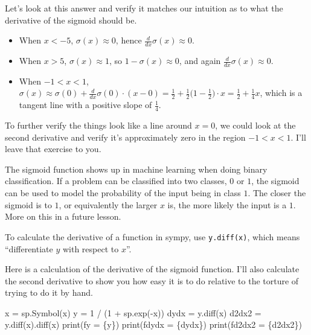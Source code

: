 \documentclass[
  letterpaper,
  DIV=11,
  numbers=noendperiod]{scrreprt}
\newenvironment{Shaded}{\begin{snugshade}}{\end{snugshade}}
\newcommand{\BuiltInTok}[1]{\textcolor[rgb]{0.00,0.23,0.31}{#1}}
\newcommand{\DecValTok}[1]{\textcolor[rgb]{0.68,0.00,0.00}{#1}}
\newcommand{\NormalTok}[1]{\textcolor[rgb]{0.00,0.23,0.31}{#1}}
\newcommand{\OperatorTok}[1]{\textcolor[rgb]{0.37,0.37,0.37}{#1}}
\newcommand{\SpecialCharTok}[1]{\textcolor[rgb]{0.37,0.37,0.37}{#1}}
\newcommand{\SpecialStringTok}[1]{\textcolor[rgb]{0.13,0.47,0.30}{#1}}
\newcommand{\StringTok}[1]{\textcolor[rgb]{0.13,0.47,0.30}{#1}}
\providecommand{\tightlist}{%
  \setlength{\itemsep}{0pt}\setlength{\parskip}{0pt}}\usepackage{longtable,booktabs,array}
\begin{document}
Let's look at this answer and verify it matches our intuition as to what
the derivative of the sigmoid should be.

\begin{itemize}
\tightlist
\item
  When \(x < -5\), \(\sigma(x) \approx 0\), hence
  \(\frac{d}{dx} \sigma(x) \approx 0\).
\item
  When \(x > 5\), \(\sigma(x) \approx 1\), so
  \(1 - \sigma(x) \approx 0\), and again
  \(\frac{d}{dx} \sigma(x) \approx 0\).
\item
  When \(-1 < x < 1\),
  \(\sigma(x) \approx \sigma(0) + \frac{d}{dx}\sigma(0) \cdot (x-0) = \frac{1}{2} + \frac{1}{2}\big(1 - \frac{1}{2}\big) \cdot x = \frac{1}{2} + \frac{1}{4}x\),
  which is a tangent line with a positive slope of \(\frac{1}{4}\).
\end{itemize}

To further verify the things look like a line around \(x=0\), we could
look at the second derivative and verify it's approximately zero in the
region \(-1 < x < 1\). I'll leave that exercise to you.

The sigmoid function shows up in machine learning when doing binary
classification. If a problem can be classified into two classes, \(0\)
or \(1\), the sigmoid can be used to model the probability of the input
being in class \(1\). The closer the sigmoid is to \(1\), or
equivalently the larger \(x\) is, the more likely the input is a \(1\).
More on this in a future lesson.

To calculate the derivative of a function in sympy, use
\texttt{y.diff(x)}, which means ``differentiate \(y\) with respect to
\(x\)''.

Here is a calculation of the derivative of the sigmoid function. I'll
also calculate the second derivative to show you how easy it is to do
relative to the torture of trying to do it by hand.

\begin{Shaded}
\begin{Highlighting}[]
\NormalTok{x }\OperatorTok{=}\NormalTok{ sp.Symbol(}\StringTok{\textquotesingle{}x\textquotesingle{}}\NormalTok{)}
\NormalTok{y }\OperatorTok{=} \DecValTok{1} \OperatorTok{/}\NormalTok{ (}\DecValTok{1} \OperatorTok{+}\NormalTok{ sp.exp(}\OperatorTok{{-}}\NormalTok{x))}
\NormalTok{dydx }\OperatorTok{=}\NormalTok{ y.diff(x)}
\NormalTok{d2dx2 }\OperatorTok{=}\NormalTok{ y.diff(x).diff(x)}
\BuiltInTok{print}\NormalTok{(}\SpecialStringTok{f\textquotesingle{}y = }\SpecialCharTok{\{}\NormalTok{y}\SpecialCharTok{\}}\SpecialStringTok{\textquotesingle{}}\NormalTok{)}
\BuiltInTok{print}\NormalTok{(}\SpecialStringTok{f\textquotesingle{}dydx = }\SpecialCharTok{\{}\NormalTok{dydx}\SpecialCharTok{\}}\SpecialStringTok{\textquotesingle{}}\NormalTok{)}
\BuiltInTok{print}\NormalTok{(}\SpecialStringTok{f\textquotesingle{}d2dx2 = }\SpecialCharTok{\{}\NormalTok{d2dx2}\SpecialCharTok{\}}\SpecialStringTok{\textquotesingle{}}\NormalTok{)}
\end{Highlighting}
\end{Shaded}
\end{document}

